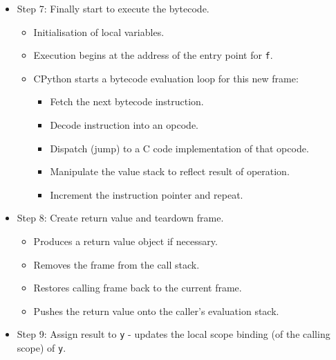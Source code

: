 \documentclass[../main.tex]{subfiles}
\begin{document}
\begin{itemize}
\begin{itemize}
\begin{itemize}
                \item args and kwargs.
            \end{itemize}
            \item While also checking for errors:
            \begin{itemize}
                \item Missing required arguments.
                \item Unexpected arguments/keywords.
                \item Other general checks.
            \end{itemize}
        \end{itemize}
        \item Step 7: Finally start to execute the bytecode.
        \begin{itemize}
            \item Initialisation of local variables.
            \item Execution begins at the address of the entry point for \verb|f|.
            \item CPython starts a bytecode evaluation loop for this new frame:
            \begin{itemize}
                \item Fetch the next bytecode instruction.
                \item Decode instruction into an opcode.
                \item Dispatch (jump) to a C code implementation of that opcode.
                \item Manipulate the value stack to reflect result of operation.
                \item Increment the instruction pointer and repeat.
            \end{itemize}
        \end{itemize}
        \item Step 8: Create return value and teardown frame.
        \begin{itemize}
            \item Produces a return value object if necessary.
            \item Removes the frame from the call stack.
            \item Restores calling frame back to the current frame.
            \item Pushes the return value onto the caller's evaluation stack.
        \end{itemize}
        \item Step 9: Assign result to \verb|y| - updates the local scope binding (of the calling scope) of \verb|y|.
    \end{itemize}\\
\end{document}
